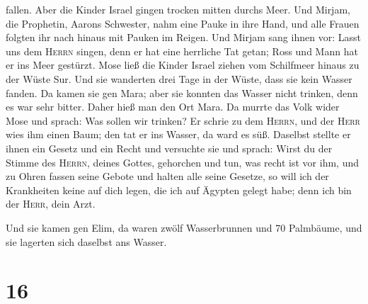 fallen. Aber die Kinder Israel gingen trocken mitten durchs Meer.
 Und Mirjam, die Prophetin, Aarons Schwester, nahm eine
Pauke in ihre Hand, und alle Frauen folgten ihr nach hinaus mit Pauken
im Reigen.  Und Mirjam sang ihnen vor: Lasst uns dem
\textsc{Herrn} singen, denn er hat eine herrliche Tat getan; Ross und
Mann hat er ins Meer gestürzt.  Mose ließ die Kinder
Israel ziehen vom Schilfmeer hinaus zu der Wüste Sur. Und sie wanderten
drei Tage in der Wüste, dass sie kein Wasser fanden.  Da
kamen sie gen Mara; aber sie konnten das Wasser nicht trinken, denn es
war sehr bitter. Daher hieß man den Ort Mara.  Da murrte
das Volk wider Mose und sprach: Was sollen wir trinken? 
Er schrie zu dem \textsc{Herrn}, und der \textsc{Herr} wies ihm einen
Baum; den tat er ins Wasser, da ward es süß. Daselbst stellte er ihnen
ein Gesetz und ein Recht und versuchte sie  und sprach:
Wirst du der Stimme des \textsc{Herrn}, deines Gottes, gehorchen und
tun, was recht ist vor ihm, und zu Ohren fassen seine Gebote und halten
alle seine Gesetze, so will ich der Krankheiten keine auf dich legen,
die ich auf Ägypten gelegt habe; denn ich bin der \textsc{Herr}, dein
Arzt.

 Und sie kamen gen Elim, da waren zwölf Wasserbrunnen und
70 Palmbäume, und sie lagerten sich daselbst ans Wasser.

\hypertarget{section-15}{%
\section{16}\label{section-15}}

